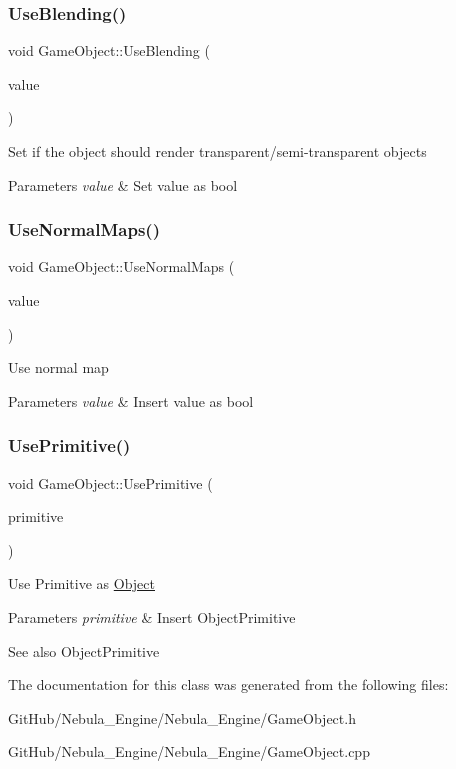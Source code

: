\subsubsection{\texorpdfstring{UseBlending()}{UseBlending()}}
{\footnotesize\ttfamily void Game\+Object\+::\+Use\+Blending (\begin{DoxyParamCaption}\item[{bool}]{value }\end{DoxyParamCaption})}

Set if the object should render transparent/semi-\/transparent objects 
\begin{DoxyParams}{Parameters}
{\em value} & Set value as bool \\
\hline
\end{DoxyParams}
\mbox{\label{class_game_object_ab59900eba23ba9d4d07ce727332d3c0b}} 
\subsubsection{\texorpdfstring{UseNormalMaps()}{UseNormalMaps()}}
{\footnotesize\ttfamily void Game\+Object\+::\+Use\+Normal\+Maps (\begin{DoxyParamCaption}\item[{bool}]{value }\end{DoxyParamCaption})}

Use normal map 
\begin{DoxyParams}{Parameters}
{\em value} & Insert value as bool \\
\hline
\end{DoxyParams}
\mbox{\label{class_game_object_a530897ca5fe14017bae2790f49b46e95}} 
\subsubsection{\texorpdfstring{UsePrimitive()}{UsePrimitive()}}
{\footnotesize\ttfamily void Game\+Object\+::\+Use\+Primitive (\begin{DoxyParamCaption}\item[{Object\+Primitive}]{primitive }\end{DoxyParamCaption})}

Use Primitive as \mbox{\hyperlink{class_object}{Object}} 
\begin{DoxyParams}{Parameters}
{\em primitive} & Insert Object\+Primitive \\
\hline
\end{DoxyParams}
\begin{DoxySeeAlso}{See also}
Object\+Primitive 
\end{DoxySeeAlso}


The documentation for this class was generated from the following files\+:\begin{DoxyCompactItemize}
\item 
Git\+Hub/\+Nebula\+\_\+\+Engine/\+Nebula\+\_\+\+Engine/Game\+Object.\+h\item 
Git\+Hub/\+Nebula\+\_\+\+Engine/\+Nebula\+\_\+\+Engine/Game\+Object.\+cpp\end{DoxyCompactItemize}

